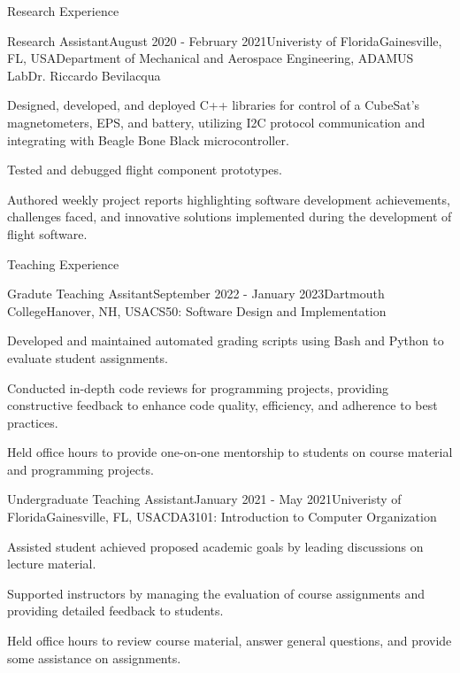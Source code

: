 \documentclass{resume} %
\begin{document}
\begin{rSection}{Research Experience}
  \begin{rSubsection_ra}{Research Assistant}{August 2020 - February 2021}{Univeristy of Florida}{Gainesville, FL, USA}{Department of Mechanical and Aerospace Engineering, ADAMUS Lab}{Dr. Riccardo Bevilacqua}
    \item Designed, developed, and deployed C++ libraries for control of a CubeSat's magnetometers, EPS, and battery, utilizing I2C protocol communication and integrating with Beagle Bone Black microcontroller.
    \item Tested and debugged flight component prototypes.
    \item Authored weekly project reports highlighting software development achievements, challenges faced, and innovative solutions implemented during the development of flight software.
  \end{rSubsection_ra}
\end{rSection}

\begin{rSection}{Teaching Experience}
\begin{rSubsection_ta}{Gradute Teaching Assitant}{September 2022 - January 2023}{Dartmouth College}{Hanover, NH, USA}{CS50: Software Design and Implementation}
  \item Developed and maintained automated grading scripts using Bash and Python to evaluate student assignments.
  \item Conducted in-depth code reviews for programming projects, providing constructive feedback to enhance code quality, efficiency, and adherence to best practices.
  \item Held office hours to provide one-on-one mentorship to students on course material and programming projects.
\end{rSubsection_ta}
\begin{rSubsection_ta}{Undergraduate Teaching Assistant}{January 2021 - May 2021}{Univeristy of Florida}{Gainesville, FL, USA}{CDA3101: Introduction to Computer Organization}
\item Assisted student achieved proposed academic goals by leading discussions on lecture material. 
\item Supported instructors by managing the evaluation of course assignments and providing detailed feedback to students.
\item Held office hours to review course material, answer general questions, and provide some assistance on assignments.
\end{rSubsection_ta}
\end{rSection}
\end{document}

